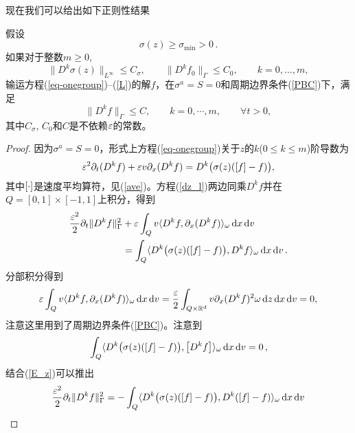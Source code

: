 现在我们可以给出如下正则性结果
\begin{thm}[{\bf 一致正则性}]\label{rgl1}
  假设
  \[
    \sigma(z)\ge\sigma_{\mathrm{min}}>0\,.
  \]
  如果对于整数$m\ge 0$,
  \begin{equation}
    \|D^k\sigma(z)\|_{L^\infty}\le C_\sigma, \qquad \|D^k f_{0}\|_{\Gamma}\le C_0,\qquad k=0,\dots,m, 
  \end{equation}  
  输运方程(\ref{eq-onegroup})--(\ref{L})的解$f$，在$\sigma^a = S = 0$和周期边界条件(\ref{PBC})下，满足
  \begin{equation}
    \|D^k f\|_{\Gamma} \le C, \qquad k=0,\cdots,m, \qquad \forall t>0,
  \end{equation}
  其中$C_\sigma$, $C_0$和$C$是不依赖$\varepsilon$的常数。
\end{thm}
\begin{proof}
  因为$\sigma^a = S = 0$，形式上方程(\ref{eq-onegroup})关于$z$的$k$($0\le k\le m$)阶导数为
  \begin{equation}\label{dz_l}
    \varepsilon^2 \partial_t (D^k f) + \varepsilon v \partial_x (D^k f) = D^k\big(\sigma(z)(\left[ f \right]-f)\big),
  \end{equation}
  其中$\left[ \cdot \right]$是速度平均算符，见(\ref{ave})。方程(\ref{dz_l})两边同乘$D^k f$并在$Q=[0,1]\times [-1,1]$上积分，得到
  \begin{equation}\label{E_z}
    \begin{split}
      \frac{\varepsilon^2}{2}\partial_t\|D^k f\|^2_{\Gamma}
      & + \varepsilon\int_Q v\langle D^k f, \partial_x(D^k f)\rangle_\omega\mathop{}\!\mathrm{d} x\mathop{}\!\mathrm{d} v
      \\
      & = \int_Q \langle D^k\big(\sigma(z)(\left[ f \right]-f)\big),D^k f \rangle_{\omega}\mathop{}\!\mathrm{d} x\mathop{}\!\mathrm{d} v\,.
    \end{split}
  \end{equation}
  分部积分得到
  \begin{equation}
    \varepsilon\int_{Q}v\langle D^k f, \partial_x(D^k f)\rangle_\omega\mathop{}\!\mathrm{d} x\mathop{}\!\mathrm{d} v = \frac{\varepsilon}{2}\int_{Q\times {\mathbb{R}}^d}v \partial_x(D^k f)^2 \omega \mathop{}\!\mathrm{d} z\mathop{}\!\mathrm{d} x\mathop{}\!\mathrm{d} v=0,
  \end{equation}
  注意这里用到了周期边界条件(\ref{PBC})。注意到
  \begin{equation}\label{meanzero}
    \int_Q \langle D^k\big(\sigma(z)(\left[ f \right]-f)\big),\left[ D^k f \right] \rangle_{\omega}\mathop{}\!\mathrm{d} x\mathop{}\!\mathrm{d} v = 0\,,
  \end{equation}
  结合(\ref{E_z})可以推出
  \begin{equation}\label{ineq:dk}
    \frac{\varepsilon^2}{2}\partial_t\|D^k f\|^2_{\Gamma} = -\int_Q \langle D^k\big(\sigma(z)(\left[ f \right]-f)\big),D^k (\left[ f \right]-f) \rangle_{\omega}\mathop{}\!\mathrm{d} x\mathop{}\!\mathrm{d} v
  \end{equation}

\end{proof}
